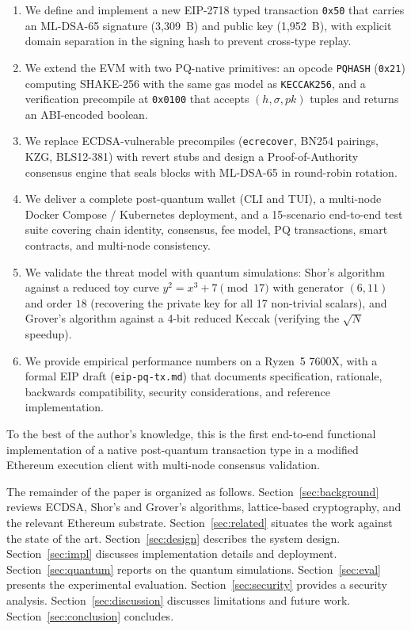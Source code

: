 \documentclass[journal,onecolumn,11pt]{IEEEtran}
\begin{document}
\begin{enumerate}
  \item We define and implement a new EIP-2718 typed transaction \texttt{0x50} that carries an ML-DSA-65 signature (3{,}309~B) and public key (1{,}952~B), with explicit domain separation in the signing hash to prevent cross-type replay.
  \item We extend the EVM with two PQ-native primitives: an opcode \texttt{PQHASH} (\texttt{0x21}) computing SHAKE-256 with the same gas model as \texttt{KECCAK256}, and a verification precompile at \texttt{0x0100} that accepts $(h, \sigma, \mathit{pk})$ tuples and returns an ABI-encoded boolean.
  \item We replace ECDSA-vulnerable precompiles (\texttt{ecrecover}, BN254 pairings, KZG, BLS12-381) with revert stubs and design a Proof-of-Authority consensus engine that seals blocks with ML-DSA-65 in round-robin rotation.
  \item We deliver a complete post-quantum wallet (CLI and TUI), a multi-node Docker Compose / Kubernetes deployment, and a 15-scenario end-to-end test suite covering chain identity, consensus, fee model, PQ transactions, smart contracts, and multi-node consistency.
  \item We validate the threat model with quantum simulations: Shor's algorithm against a reduced toy curve $y^2 = x^3 + 7 \pmod{17}$ with generator $(6,11)$ and order $18$ (recovering the private key for all 17 non-trivial scalars), and Grover's algorithm against a 4-bit reduced Keccak (verifying the $\sqrt{N}$ speedup).
  \item We provide empirical performance numbers on a Ryzen~5 7600X, with a formal EIP draft (\texttt{eip-pq-tx.md}) that documents specification, rationale, backwards compatibility, security considerations, and reference implementation.
\end{enumerate}

To the best of the author's knowledge, this is the first end-to-end functional implementation of a native post-quantum transaction type in a modified Ethereum execution client with multi-node consensus validation.

The remainder of the paper is organized as follows. Section~\ref{sec:background} reviews ECDSA, Shor's and Grover's algorithms, lattice-based cryptography, and the relevant Ethereum substrate. Section~\ref{sec:related} situates the work against the state of the art. Section~\ref{sec:design} describes the system design. Section~\ref{sec:impl} discusses implementation details and deployment. Section~\ref{sec:quantum} reports on the quantum simulations. Section~\ref{sec:eval} presents the experimental evaluation. Section~\ref{sec:security} provides a security analysis. Section~\ref{sec:discussion} discusses limitations and future work. Section~\ref{sec:conclusion} concludes.
\end{document}
